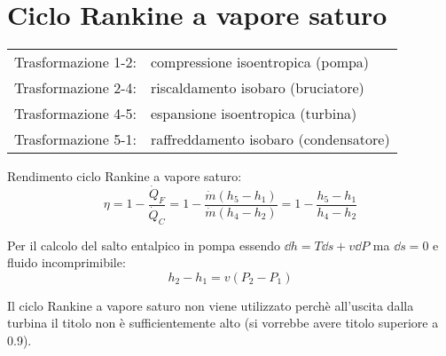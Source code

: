\section{Ciclo Rankine a vapore saturo}
\begin{tabular}{p{2.5cm}l}
Trasformazione 1-2: & compressione isoentropica (pompa)\\
Trasformazione 2-4: & riscaldamento isobaro (bruciatore)\\
Trasformazione 4-5: & espansione isoentropica (turbina)\\
Trasformazione 5-1: & raffreddamento isobaro (condensatore)\\
\end{tabular}

Rendimento ciclo Rankine a vapore saturo:
\[ \eta = 1 - \frac{\dot{Q}_F}{\dot{Q}_C} = 1 - \frac{\dot{m}(h_5-h_1)}{\dot{m}(h_4-h_2)} = 1 - \frac{h_5-h_1}{h_4-h_2} \]

Per il calcolo del salto entalpico in pompa essendo $\dd{h} = T\dd{s} + v\dd{P}$ ma $\dd{s} = 0$ e fluido incomprimibile:
\[ h_2-h_1 = v(P_2-P_1) \]

Il ciclo Rankine a vapore saturo non viene utilizzato perchè all'uscita dalla turbina il titolo non è sufficientemente alto (si vorrebbe avere titolo superiore a 0.9).
